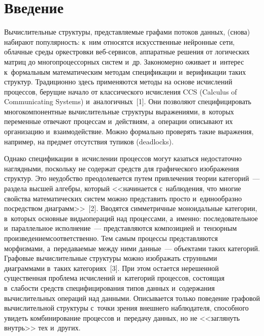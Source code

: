   
\vspace*{4pt}



\thispagestyle{headings}

\begin{multicols}{2}

\label{st\stat}

\section{Введение}

\vspace*{-4pt}

  Вычислительные структуры, пред\-став\-ля\-емые графами потоков данных, 
(снова) набирают по\-пу\-ляр\-ность: к~ним относятся искусственные нейронные 
сети, облачные среды оркестровки веб-сер\-ви\-сов, аппаратные решения от 
логических мат\-риц до многопроцессорных систем и~др. Закономерно 
оживает и~интерес к~формальным математическим методам спецификации 
и~верификации таких структур. Традиционно здесь применяются методы на 
основе ис\-чис\-ле\-ний процессов, берущие начало от классического исчисления 
CCS (Calculus of Communicating Systems) и~аналогичных~[1]. Они позволяют 
специфицировать многокомпонентные вы\-чис\-ли\-тель\-ные структуры 
выражениями, в~которых переменные отвечают процессам и~действиям, 
а~операции описывают их организацию и~взаимодействие. Можно формально 
проверять такие выражения, например, на предмет отсутствия тупиков 
(deadlocks).
  
  Однако спецификации в~исчислении процессов могут казаться недостаточно 
наглядными, поскольку не содержат средств для графического изображения 
струк\-тур. Это неудобство преодолевается \mbox{путем} привлечения тео\-рии 
категорий~--- раздела высшей ал\-геб\-ры, который <<начинается с~наблюдения, 
что многие свойства математических сис\-тем мож\-но представить просто 
и~единообразно посредством диаграмм>>~[2]. Вводятся симметричные 
моноидальные категории, в~которых основные виды\linebreak операций над процессами, 
а~именно: последовательное и~параллельное исполнение~--- пред\-став\-ля\-ют\-ся 
композицией и~тензорным произведением\linebreak соответственно. Тем самым 
процессы представляются морфизмами, а~пе\-ре\-да\-ва\-емые меж\-ду ними  
данные~--- объектами таких категорий. Графовые вы\-чис\-ли\-тель\-ные структуры 
мож\-но изображать струнными диаграммами в~таких категориях~[3].
  При этом остается нерешенной существенная проб\-ле\-ма исчислений 
и~категорий процессов, со\-сто\-ящая в~сла\-бости средств специфицирования типов 
данных и~содержания вы\-чис\-ли\-тель\-ных операций над данными. Описывается 
только поведение графовой вы\-чис\-ли\-тель\-ной структуры с~точки зрения 
внеш\-не\-го наблюдателя, способного увидеть комбинирование процессов 
и~передачу данных, но не <<заглянуть \mbox{внутрь}>> тех и~других. 



\end{multicols}
